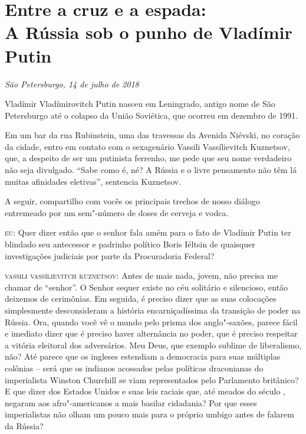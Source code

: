 \chapter*{Entre a cruz e a espada:\\A Rússia sob o punho de Vladímir Putin}

\begin{flushright}
\emph{São Petersburgo, 14 de julho de 2018}
\end{flushright}

Vladímir Vladímirovitch Putin nasceu em Leningrado, antigo nome de São
Petersburgo até o colapso da União Soviética, que ocorreu em dezembro de
1991.

Em um bar da rua Rubinstein, uma das travessas da Avenida Niévski, no
coração da cidade, entro em contato com o sexagenário Vassili
Vassílievitch Kuznetsov, que, a despeito de ser um putinista ferrenho,
me pede que seu nome verdadeiro não seja divulgado. ``Sabe como é, né? A
Rússia e o livre pensamento não têm lá muitas afinidades eletivas'',
sentencia Kuznetsov.

A seguir, compartilho com vocês os principais trechos de nosso diálogo
entremeado por um sem"-número de doses de cerveja e vodca.

\textsc{eu:} Quer dizer então que o senhor fala amém para o fato de
Vladímir Putin ter blindado seu antecessor e padrinho político Boris
Iéltsin de quaisquer investigações judiciais por parte da Procuradoria
Federal?

\textsc{vassili vassílievitch kuznetsov:} Antes de mais nada, jovem, não
precisa me chamar de ``senhor''. O Senhor sequer existe no céu solitário
e silencioso, então deixemos de cerimônias. Em seguida, é preciso dizer
que as suas colocações simplesmente desconsideram a história
encarniçadíssima da transição de poder na Rússia. Ora, quando você vê o
mundo pelo prisma dos anglo"-saxões, parece fácil e imediato dizer que é
preciso haver alternância no poder, que é preciso respeitar a vitória
eleitoral dos adversários. Meu Deus, que exemplo sublime de liberalismo,
não? Até parece que os ingleses estendiam a democracia para suas
múltiplas colônias -- será que os indianos acossados pelas políticas
draconianas do imperialista Winston Churchill se viam representados pelo
Parlamento britânico? E que dizer dos Estados Unidos e suas leis raciais
que, até meados do século , negaram aos afro"-americanos a mais basilar
cidadania? Por que esses imperialistas não olham um pouco mais para o
próprio umbigo antes de falarem da Rússia?

